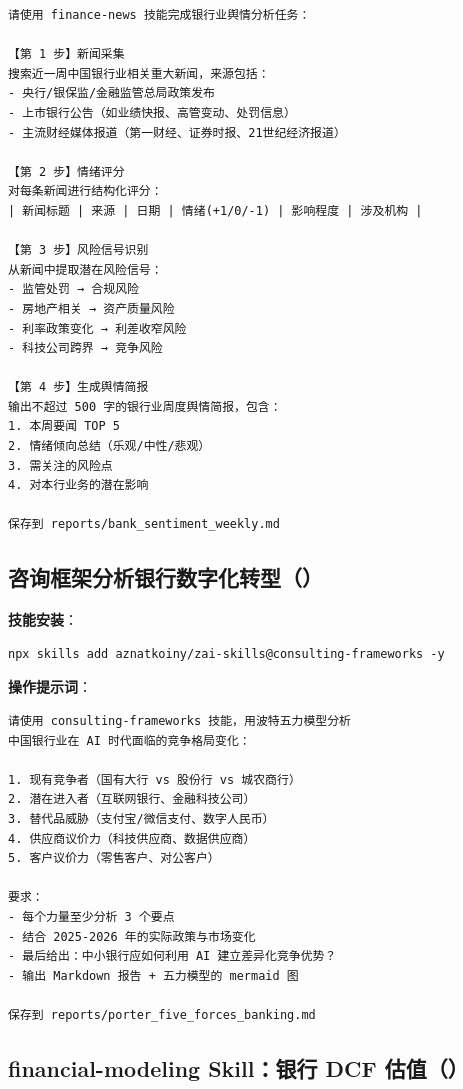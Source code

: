 \begin{lstlisting}
请使用 finance-news 技能完成银行业舆情分析任务：

【第 1 步】新闻采集
搜索近一周中国银行业相关重大新闻，来源包括：
- 央行/银保监/金融监管总局政策发布
- 上市银行公告（如业绩快报、高管变动、处罚信息）
- 主流财经媒体报道（第一财经、证券时报、21世纪经济报道）

【第 2 步】情绪评分
对每条新闻进行结构化评分：
| 新闻标题 | 来源 | 日期 | 情绪(+1/0/-1) | 影响程度 | 涉及机构 |

【第 3 步】风险信号识别
从新闻中提取潜在风险信号：
- 监管处罚 → 合规风险
- 房地产相关 → 资产质量风险
- 利率政策变化 → 利差收窄风险
- 科技公司跨界 → 竞争风险

【第 4 步】生成舆情简报
输出不超过 500 字的银行业周度舆情简报，包含：
1. 本周要闻 TOP 5
2. 情绪倾向总结（乐观/中性/悲观）
3. 需关注的风险点
4. 对本行业务的潜在影响

保存到 reports/bank_sentiment_weekly.md
\end{lstlisting}

\subsection{咨询框架分析银行数字化转型（）}

\textbf{技能安装}：

\begin{lstlisting}[style=shell]
npx skills add aznatkoiny/zai-skills@consulting-frameworks -y
\end{lstlisting}

\textbf{操作提示词}：

\begin{lstlisting}
请使用 consulting-frameworks 技能，用波特五力模型分析
中国银行业在 AI 时代面临的竞争格局变化：

1. 现有竞争者（国有大行 vs 股份行 vs 城农商行）
2. 潜在进入者（互联网银行、金融科技公司）
3. 替代品威胁（支付宝/微信支付、数字人民币）
4. 供应商议价力（科技供应商、数据供应商）
5. 客户议价力（零售客户、对公客户）

要求：
- 每个力量至少分析 3 个要点
- 结合 2025-2026 年的实际政策与市场变化
- 最后给出：中小银行应如何利用 AI 建立差异化竞争优势？
- 输出 Markdown 报告 + 五力模型的 mermaid 图

保存到 reports/porter_five_forces_banking.md
\end{lstlisting}

\subsection{financial-modeling Skill：银行 DCF 估值（）}

